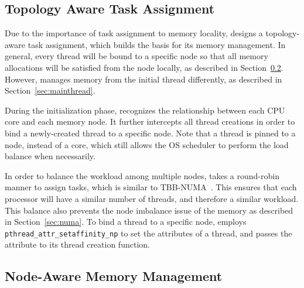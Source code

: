 \subsection{Topology Aware Task Assignment} 
\label{sec:taskassign}

Due to the importance of task assignment to  memory locality, \NA{} designs a topology-aware task assignment, which builds the basis for its memory management. In general, every thread will be bound to a specific node so that all memory allocations will be satisfied from the node locally, as described in Section~\ref{sec:nodeaware-memory}. However, \NA{} manages memory from the initial thread differently, as described in Section~\ref{sec:mainthread}. 

During the initialization phase, \NA{} recognizes the relationship between each CPU core and each memory node. It further intercepts all thread creations in order to bind a newly-created thread to a specific node. Note that a thread is pinned to a node, instead of a core, which still allows the OS scheduler to perform the load balance when necessarily.

In order to balance the workload among multiple nodes, \NA{} takes a round-robin manner to assign tasks, which is similar to TBB-NUMA~\cite{Majo:2015:LPC:2688500.2688509}.  This ensures that each processor will have a similar number of threads, and therefore a similar workload. This balance also prevents the node imbalance issue of the memory as described in Section~\ref{sec:numa}. To bind a thread to a specific node, \NA{} employs \texttt{pthread\_attr\_setaffinity\_np} to set the attributes of a thread, and passes the attribute to its thread creation function. 

\subsection{Node-Aware Memory Management} 
\label{sec:nodeaware-memory}

